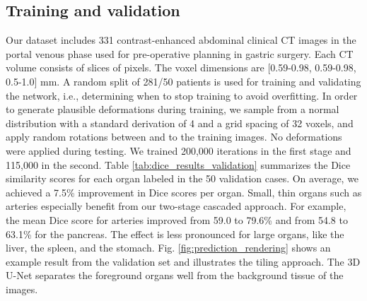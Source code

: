\documentclass[authoryear]{elsarticle}
\begin{document}
\subsection{Training and validation} 
\label{sec:train-and-val}
Our dataset includes 331 contrast-enhanced abdominal clinical CT images in the portal venous phase used for pre-operative planning in gastric surgery. Each CT volume consists of  slices of  pixels. The voxel dimensions are [0.59-0.98, 0.59-0.98, 0.5-1.0] mm. A random split of 281/50 patients is used for training and validating the network, i.e., determining when to stop training to avoid overfitting. In order to generate plausible deformations during training, we sample from a normal distribution with a standard derivation of 4 and a grid spacing of 32 voxels, and apply random rotations between  and  to the training images. No deformations were applied during testing. We trained 200,000 iterations in the first stage and 115,000 in the second. Table \ref{tab:dice_results_validation} summarizes the Dice similarity scores for each organ labeled in the 50 validation cases. On average, we achieved a 7.5\% improvement in Dice scores per organ. Small, thin organs such as arteries especially benefit from our two-stage cascaded approach. For example, the mean Dice score for arteries improved from 59.0 to 79.6\% and from 54.8 to 63.1\% for the pancreas. The effect is less pronounced for large organs, like the liver, the spleen, and the stomach. Fig. \ref{fig:prediction_rendering} shows an example result from the validation set and illustrates the tiling approach. The 3D U-Net separates the foreground organs well from the background tissue of the images. 
\end{document}
